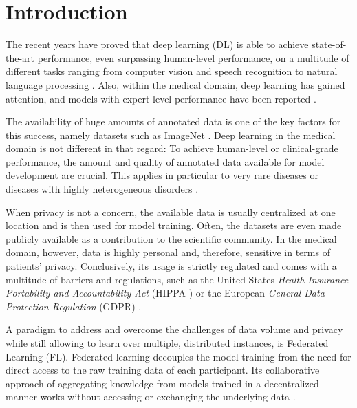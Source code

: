 \section{Introduction}
\label{sec:Introduction}



The recent years have proved that deep learning (DL) \citep{Lecun2015DeepLearning} is able to achieve state-of-the-art performance, even surpassing human-level performance, on a multitude of different tasks ranging from computer vision and speech recognition to natural language processing \citep{He2015DelvingClassification, Hinton2012DeepGroups, Devlin2019BERT:Understanding}. Also, within the medical domain, deep learning has gained attention, and models with expert-level performance have been reported \citep{Esteva2017Dermatologist-levelNetworks}.

The availability of huge amounts of annotated data is one of the key factors for this success, namely datasets such as ImageNet \citep{Deng2009ImageNet:Database}. Deep learning in the medical domain is not different in that regard: To achieve human-level or clinical-grade performance, the amount and quality of annotated data available for model development are crucial. This applies in particular to very rare diseases or diseases with highly heterogeneous disorders \citep{Esteva2017Dermatologist-levelNetworks, DeFauw2018ClinicallyDisease, Dluhos2017Multi-centerApproach}.

When privacy is not a concern, the available data is usually centralized at one location and is then used for model training. Often, the datasets are even made publicly available as a contribution to the scientific community. In the medical domain, however, data is highly personal and, therefore, sensitive in terms of patients' privacy. Conclusively, its usage is strictly regulated and comes with a multitude of barriers and regulations, such as the United States \textit{Health Insurance Portability and Accountability Act} (HIPPA \cite{USDepartmentofHealthandHumanServices2020HealthHIPPA}) or the European \textit{General Data Protection Regulation} (GDPR\cite{IntersoftConsulting2016GeneralGDPR}) \citep{vanPanhuis2014AHealth}.

A paradigm to address and overcome the challenges of data volume and privacy while still allowing to learn over multiple, distributed instances, is Federated Learning (FL). Federated learning decouples the model training from the need for direct access to the raw training data of each participant. Its collaborative approach of aggregating knowledge from models trained in a decentralized manner works without accessing or exchanging the underlying data \citep{BrendanMcMahan2017}.

